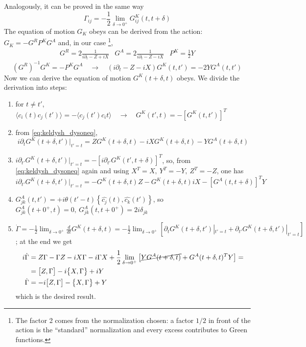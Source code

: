 \documentclass[a4paper,11pt]{article}
\theoremstyle{remark}
\newcommand{\mean}[1]{\ensuremath{\langle #1 \rangle}}
\newcommand{\ra}{\rightarrow}
\newcommand{\nl}{\vskip 0.3cm}
\begin{document}
  Analogously, it can be proved in the same way
  \begin{equation*}
   \Gamma_{ij}=-\frac{1}{2}\lim_{\delta\to0^+}G^K_{ij}(t,t+\delta)
  \end{equation*}
  \nl
  The equation of motion $G_K$ obeys can be derived from the action: $G_K=-G^RP^KG^A$ and, in our case \footnote{The factor 2 comes from the normalization chosen: a factor $1/2$ in front of the action is the ``standard'' normalization and every excess contributes to Green functions. },
  \begin{equation*}
   \begin{array}{ccc}
    G^R=2\frac{1}{i\partial_t-Z+iX} & G^A=2\frac{1}{i\partial_t-Z-iX} & P^K=\frac{1}{2}Y
   \end{array}
   \end{equation*}
  \begin{equation}
   (G^R)^{-1}G^K = -P^KG^A \quad\ra\quad (i\partial_t -Z -iX)G^K(t,t')=-2YG^A(t,t') \label{eq:keldysh_dysoneq}
  \end{equation}
  Now we can derive the equation of motion $G^K(t+\delta,t)$ obeys. We divide the derivation into steps: 
  \begin{enumerate}
   \item for $t\neq t'$, $\mean{c_i(t)c_j(t')}=-\mean{c_j(t')c_i{t}} \quad \ra \quad G^K(t',t)=-[G^K(t,t')]^T$
   \item from \ref{eq:keldysh_dysoneq}, $$\displaystyle i\partial_tG^K(t+\delta,t')|_{t'=t} = ZG^K(t+\delta,t) -iXG^K(t+\delta,t)-YG^A(t+\delta,t)$$
   \item $\displaystyle i\partial_{t'}G^K(t+\delta,t')|_{t'=t} = -\left[i\partial_{t'}G^K(t',t+\delta)\right]^T$, so, from \ref{eq:keldysh_dysoneq} again and using $\displaystyle X^T=X,\ Y^T=-Y,\ Z^T=-Z$, one has $$\displaystyle i\partial_{t'}G^K(t+\delta,t')|_{t'=t} = - G^K(t+\delta,t)Z - G^K(t+\delta,t)iX-\left[G^A(t,t+\delta)\right]^TY$$
   \item $\displaystyle G^A_{jk}(t,t')=+i\theta(t'-t)\left\{\hat{c_j}(t),\hat{c_k}(t')\right\}$, so $\displaystyle G^A_{jk}(t+0^+,t)=0,\ G^A_{jk}(t,t+0^+)=2i\delta_{jk}$
   \item $\displaystyle\dot{\Gamma}=-\frac{1}{2}\lim_{\delta\to0^+}\frac{d}{dt}G^K(t+\delta,t)=-\frac{1}{2}\lim_{\delta\to0^+}\left[\partial_tG^K(t+\delta,t')|_{t'=t}+\partial_{t'}G^K(t+\delta,t')|_{t'=t}\right]$; at the end we get
   \begin{align*}
    i\dot{\Gamma} &= Z\Gamma - \Gamma Z - iX\Gamma -i\Gamma X +\frac{1}{2}\lim_{\delta\to 0^+}\left[\cancel{YG^A(t+\delta,t)}+ G^A(t+\delta,t)^TY\right] = \\
    &= \big[Z,\Gamma\big] -i\big\{X,\Gamma\big\} +iY \\
    \dot{\Gamma} &= -i\big[Z,\Gamma\big] -\big\{X,\Gamma\big\} +Y
   \end{align*}
   which is the desired result.
  \end{enumerate}
 \pagebreak
\end{document}
